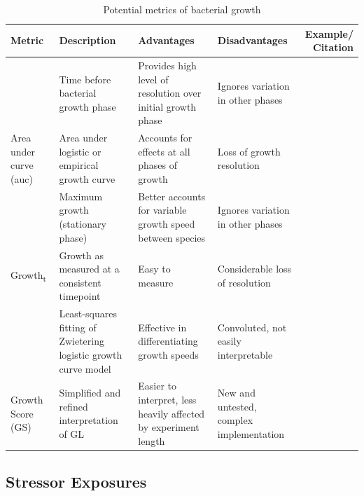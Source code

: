 \documentclass[final,1p,times]{elsarticle}
\begin{document}
\begin{table}[ht]
\centering
\scriptsize
\renewcommand{\arraystretch}{1.8}
\begin{tabular}{L M L L N}
\toprule 
\textbf{Metric} & \textbf{Description} & \textbf{Advantages} & \textbf{Disadvantages} & \textbf{Example/ Citation} \\
\midrule
{} & Time before bacterial growth phase & Provides high level of resolution over initial growth phase & Ignores variation in other phases & \cite{Monod1949} \\
{Area under curve (auc)} & Area under logistic or empirical growth curve & Accounts for effects at all phases of growth & Loss of growth resolution & \cite{Firsov2001} \\
 & Maximum growth (stationary phase) & Better accounts for variable growth speed between species & Ignores variation in other phases & \cite{Chapman2018} \\
{Growth\textsubscript{t}} & Growth as measured at a consistent timepoint & Easy to measure & Considerable loss of resolution & \cite{Hall2014} \\
 & Least-squares fitting of Zwietering logistic growth curve model & Effective in differentiating growth speeds &  Convoluted, not easily interpretable & \cite{Cuevas2017,Cuevas2018}\\
{Growth Score (GS)} & Simplified and refined interpretation of GL & Easier to interpret, less heavily affected by experiment length & New and untested, complex implementation & \cite{Cuevas2018}\\
\bottomrule
\end{tabular}
\caption{Potential metrics of bacterial growth}
\label{tab:metrics}
\end{table}

\subsection{Stressor Exposures}
\label{S:2:5}
\end{document}
